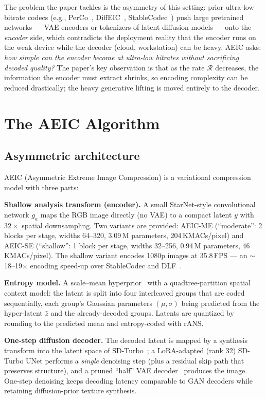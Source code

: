 \documentclass[conference]{IEEEtran}
\begin{document}
The problem the paper tackles is the asymmetry of this setting: prior ultra-low bitrate codecs
(e.g., PerCo~\cite{perco}, DiffEIC~\cite{diffeic}, StableCodec~\cite{stablecodec}) push large
pretrained networks --- VAE encoders or tokenizers of latent diffusion models --- onto the
\emph{encoder} side, which contradicts the deployment reality that the encoder runs on the weak
device while the decoder (cloud, workstation) can be heavy. AEIC asks: \emph{how simple can the
encoder become at ultra-low bitrates without sacrificing decoded quality?} The paper's key
observation is that as the rate $\mathcal{R}$ decreases, the information the encoder must extract
shrinks, so encoding complexity can be reduced drastically; the heavy generative lifting is moved
entirely to the decoder.

\section{The AEIC Algorithm}
\subsection{Asymmetric architecture}
AEIC (Asymmetric Extreme Image Compression) is a variational compression model with three parts:

\textbf{Shallow analysis transform (encoder).} A small StarNet-style convolutional network
$g_a$ maps the RGB image directly (no VAE) to a compact latent $y$ with $32\times$ spatial
downsampling. Two variants are provided: \mbox{AEIC-ME} (``moderate'': 2 blocks per stage,
widths 64--320, 3.09\,M parameters, 204\,KMACs/pixel) and \mbox{AEIC-SE} (``shallow'': 1 block
per stage, widths 32--256, 0.94\,M parameters, 46\,KMACs/pixel). The shallow variant encodes
1080p images at 35.8\,FPS --- an $\sim$18--19$\times$ encoding speed-up over StableCodec and
DLF~\cite{aeic}.

\textbf{Entropy model.} A scale--mean hyperprior~\cite{balle} with a quadtree-partition spatial
context model: the latent is split into four interleaved groups that are coded sequentially, each
group's Gaussian parameters $(\mu,\sigma)$ being predicted from the hyper-latent $\hat z$ and the
already-decoded groups. Latents are quantized by rounding to the predicted mean and
entropy-coded with rANS.

\textbf{One-step diffusion decoder.} The decoded latent is mapped by a synthesis transform into
the latent space of SD-Turbo~\cite{sdturbo}; a LoRA-adapted (rank 32) SD-Turbo UNet performs a
\emph{single} denoising step (plus a residual skip path that preserves structure), and a pruned
``half'' VAE decoder~\cite{adcsr} produces the image. One-step denoising keeps decoding latency
comparable to GAN decoders while retaining diffusion-prior texture synthesis.
\end{document}
